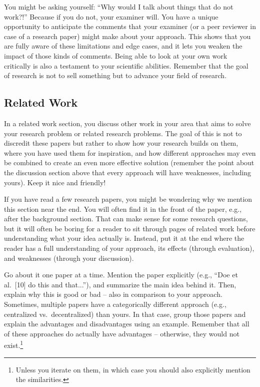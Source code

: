 \documentclass[a4paper]{article}
\begin{document}
You might be asking yourself:
``Why would I talk about things that do not work?!''
Because if you do not, your examiner will.
You have a unique opportunity to anticipate the comments that your examiner (or a peer reviewer in case of a research paper) might make about your approach.
This shows that you are fully aware of these limitations and edge cases, and it lets you weaken the impact of those kinds of comments.
Being able to look at your own work critically is also a testament to your scientific abilities.
Remember that the goal of research is not to sell something but to advance your field of research.

\subsection{Related Work}
\label{subsec:relatedwork}

In a related work section, you discuss other work in your area that aims to solve your research problem or related research problems.
The goal of this is not to discredit these papers but rather to show how your research builds on them, where you have used them for inspiration, and how different approaches may even be combined to create an even more effective solution (remember the point about the discussion section above that every approach will have weaknesses, including yours).
Keep it nice and friendly!

If you have read a few research papers, you might be wondering why we mention this section near the end.
You will often find it in the front of the paper, e.g., after the background section.
That can make sense for some research questions, but it will often be boring for a reader to sit through pages of related work before understanding what your idea actually is.
Instead, put it at the end where the reader has a full understanding of your approach, its effects (through evaluation), and weaknesses (through your discussion).

Go about it one paper at a time.
Mention the paper explicitly (e.g., ``Doe et al.~[10] do this and that...''), and summarize the main idea behind it.
Then, explain why this is good or bad -- also in comparison to your approach.
Sometimes, multiple papers have a categorically different approach (e.g., centralized vs.~decentralized) than yours.
In that case, group those papers and explain the advantages and disadvantages using an example.
Remember that all of these approaches do actually have advantages -- otherwise, they would not exist.\footnote{Unless you iterate on them, in which case you should also explicitly mention the similarities.}
\end{document}
